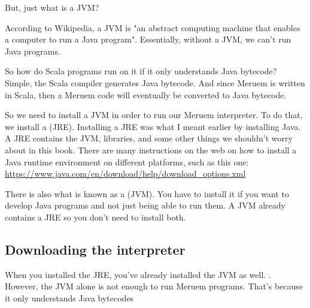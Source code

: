 But, just what is a JVM? 

According to Wikipedia, a JVM is "an abstract computing machine that enables a computer to run a Java program". Essentially, without a JVM, we can't run Java programs. 

So how do Scala programs run on it if it only understands Java bytecode? Simple, the Scala compiler generates Java bytecode. And since Meruem is written in Scala, then a Meruem code will eventually be converted to Java bytecode. 

So we need to install a JVM in order to run our Meruem interpreter. To do that, we install a (JRE). Installing a JRE was what I meant earlier by installing Java. A JRE contains the JVM, libraries, and some other things we shouldn't worry about in this book. There are many instructions on the web on how to install a Java runtime environment on different platforms, such as this one: \url{ https://www.java.com/en/download/help/download_options.xml}

\begin{noteparagraph}
	There is also what is known as a (JVM). You have to 	 
	install it if you want to develop Java programs and not just being able to run them. A JVM 
	already contains a JRE so you don't need to install both.
\end{noteparagraph}

\subsection{Downloading the interpreter}
When you installed the JRE, you've already installed the JVM as well. . However, the JVM alone is not enough to run Meruem programs. That's because it only understands Java bytecodes

